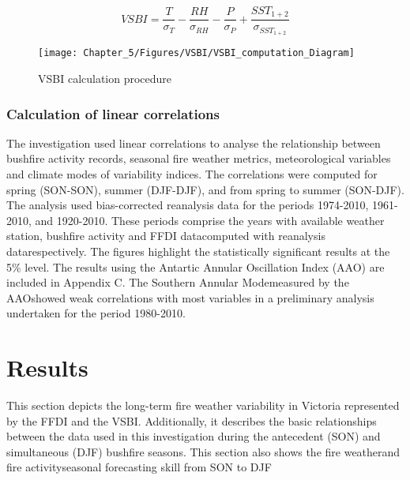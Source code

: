 \noindent \begin{center}
\begin{equation}
VSBI=\frac{T}{\sigma_{T}}-\frac{RH}{\sigma_{RH}}-\frac{P}{\sigma_{P}}+\frac{SST_{1+2}}{\sigma_{SST_{1+2}}}\label{eq:VSBI}
\end{equation}

\par\end{center}

\begin{figure}[h]
\caption{VSBI calculation procedure \label{fig:VSBI calculation procedure} }


\noindent \centering{}\texttt{[image: Chapter\_5/Figures/VSBI/VSBI\_computation\_Diagram]}
\end{figure}



\subsubsection{Calculation of linear correlations}

The investigation used linear correlations to analyse the relationship
between bushfire activity records, seasonal fire weather metrics,
meteorological variables and climate modes of variability indices.
The correlations were computed for spring (SON-SON), summer (DJF-DJF),
and from spring to summer (SON-DJF). The analysis used bias-corrected
reanalysis data for the periods 1974-2010, 1961-2010, and 1920-2010.
These periods comprise the years with available weather station, bushfire
activity and FFDI data\textemdash computed with reanalysis data\textemdash respectively.
The figures highlight the statistically significant results at the
5\% level. The results using the Antartic Annular Oscillation Index
(AAO) are included in Appendix C. The Southern Annular Mode\textemdash measured
by the AAO\textemdash showed weak correlations with most variables
in a preliminary analysis undertaken for the period 1980-2010. 


\section{Results}

This section depicts the long-term fire weather variability in Victoria
represented by the FFDI and the VSBI. Additionally, it describes the
basic relationships between the data used in this investigation during
the antecedent (SON) and simultaneous (DJF) bushfire seasons. This
section also shows the fire weather\textemdash and fire activity\textemdash seasonal
forecasting skill from SON to DJF 


